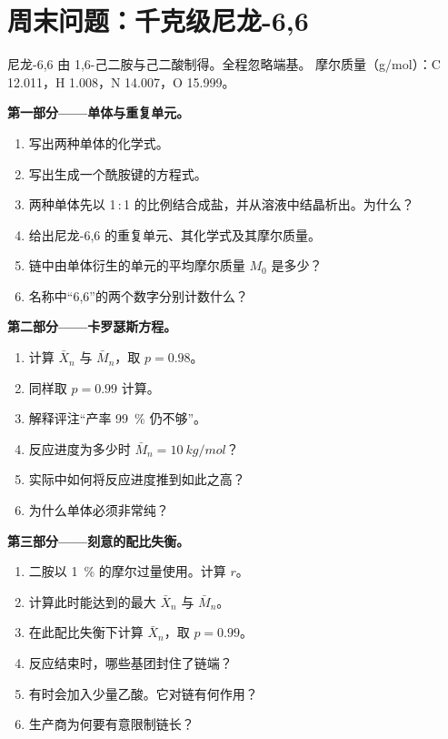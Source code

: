 \section{周末问题：千克级尼龙-6,6}

\begin{problem}
\label{pb:b2:polymer-synthesis:1}
尼龙-6,6 由 1,6-己二胺与己二酸制得。全程忽略端基。
摩尔质量（\unit{g/mol}）：C 12.011，H 1.008，N 14.007，O 15.999。

\medskip
\noindent\textbf{第一部分——单体与重复单元。}
\begin{enumerate}
  \item 写出两种单体的化学式。
  \item 写出生成一个酰胺键的方程式。
  \item 两种单体先以 1\,:\,1 的比例结合成盐，并从溶液中结晶析出。为什么？
  \item 给出尼龙-6,6 的重复单元、其化学式及其摩尔质量。
  \item 链中由单体衍生的单元的平均摩尔质量 $M_0$ 是多少？
  \item 名称中“6,6”的两个数字分别计数什么？
\end{enumerate}

\medskip
\noindent\textbf{第二部分——卡罗瑟斯方程。}
\begin{enumerate}[resume]
  \item 计算 $\bar X_n$ 与 $\bar M_n$，取 $p = 0.98$。
  \item 同样取 $p = 0.99$ 计算。
  \item 解释评注“产率 99~\% 仍不够”。
  \item 反应进度为多少时 $\bar M_n = \qty{10}{kg/mol}$？
  \item 实际中如何将反应进度推到如此之高？
  \item 为什么单体必须非常纯？
\end{enumerate}

\medskip
\noindent\textbf{第三部分——刻意的配比失衡。}
\begin{enumerate}[resume]
  \item 二胺以 1~\% 的摩尔过量使用。计算 $r$。
  \item 计算此时能达到的最大 $\bar X_n$ 与 $\bar M_n$。
  \item 在此配比失衡下计算 $\bar X_n$，取 $p = 0.99$。
  \item 反应结束时，哪些基团封住了链端？
  \item 有时会加入少量乙酸。它对链有何作用？
  \item 生产商为何要有意限制链长？
\end{enumerate}


\end{problem}
